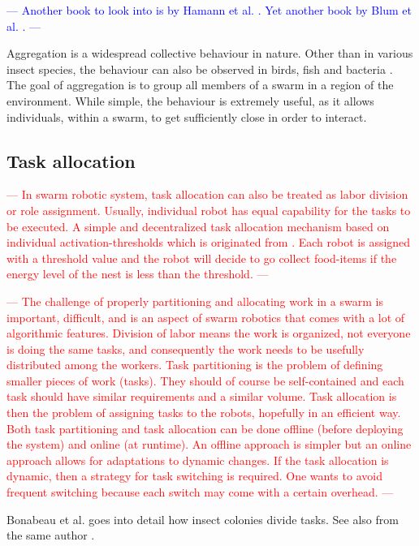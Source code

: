 \textcolor{blue}{---
Another book to look into is by Hamann et al. \cite{hamann2018swarm}.
Yet another book by Blum et al. \cite{blum2008swarm}.
---}

Aggregation is a widespread collective behaviour in nature.
Other than in various insect species, the behaviour can also be observed in birds, fish and bacteria \cite{camazine2020self}.
The goal of aggregation is to group all members of a swarm in a region of the environment.
While simple, the behaviour is extremely useful, as it allows individuals, within a swarm, to get sufficiently close in order to interact.

\subsection{Task allocation} \label{subsection:task_allocation}

\textcolor{red}{---
In swarm robotic system, task allocation can also be treated as labor division or role assignment. 
Usually, individual robot has equal capability for the tasks to be executed.
A simple and decentralized task allocation mechanism based on individual activation-thresholds which is originated from \cite{bonabeau1998fixed}. 
Each robot is assigned with a threshold value  and the robot will decide to go collect food-items if the energy level of the nest is less than the threshold.
---}

\textcolor{red}{---
The challenge of properly partitioning and allocating work in a swarm is important, difficult, 
and is an aspect of swarm robotics that comes with a lot of algorithmic features. 
Division of labor means the work is organized, 
not everyone is doing the same tasks, and consequently the work needs to be usefully distributed among the workers. 
Task partitioning is the problem of defining smaller pieces of work (tasks). 
They should of course be self-contained and each task should have similar requirements and a similar volume. 
Task allocation is then the problem of assigning tasks to the robots, hopefully in an efficient way. 
Both task partitioning and task allocation can be done offline (before deploying the system) and online (at runtime). 
An offline approach is simpler but an online approach allows for adaptations to dynamic changes. 
If the task allocation is dynamic, then a strategy for task switching is required. 
One wants to avoid frequent switching because each switch may come with a certain overhead.
---}

Bonabeau et al. \cite[Chapter~3]{bonabeau1999swarm} goes into detail how insect colonies divide tasks.
See also from the same author \cite{bonabeau1998fixed}.


